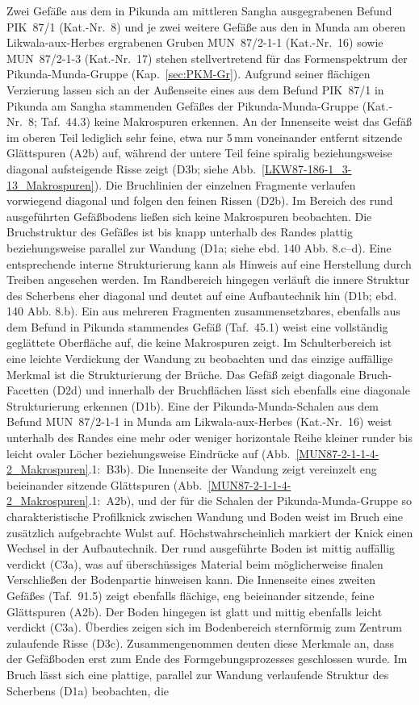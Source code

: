 \begin{multicols}{2}
Zwei Gefäße aus dem in Pikunda am mittleren \mbox{Sangha} ausgegrabenen Befund PIK~87/1 (Kat.-Nr.~8) und je zwei weitere Gefäße aus den in Munda am oberen \mbox{Likwala}-\mbox{aux}-\mbox{Herbes} ergrabenen Gruben MUN~87/2-1-1 (Kat.-Nr.~16) sowie MUN~87/2-1-3 (Kat.-Nr.~17) stehen stellvertretend für das Formenspektrum der Pikunda-Munda-Gruppe (Kap.~\ref{sec:PKM-Gr}). Aufgrund seiner flächigen Verzierung lassen sich an der Außenseite eines aus dem Befund PIK~87/1 in Pikunda am \mbox{Sangha} stammenden Gefäßes der Pikunda-Munda-Gruppe (Kat.-Nr.~8; Taf.~44.3) keine Makrospuren erkennen. An der Innenseite weist das Gefäß im oberen Teil lediglich sehr feine, etwa nur 5\,mm voneinander entfernt sitzende Glättspuren (A2b) auf, während der untere Teil feine spiralig beziehungsweise diagonal aufsteigende Risse zeigt (D3b; siehe Abb.~\ref{LKW87-186-1_3-13_Makrospuren}). Die Bruchlinien der einzelnen Fragmente verlaufen vorwiegend diagonal und folgen den feinen Rissen (D2b). Im Bereich des rund ausgeführten Gefäßbodens ließen sich keine Makrospuren beobachten. Die Bruchstruktur des Gefäßes ist bis knapp unterhalb des Randes plattig beziehungsweise parallel zur Wandung (D1a; siehe ebd. 140 Abb. 8.c--d). Eine entsprechende interne Strukturierung kann als Hinweis auf eine Herstellung durch Treiben angesehen werden. Im Randbereich hingegen verläuft die innere Struktur des Scherbens eher diagonal und deutet auf eine Aufbautechnik hin (D1b; ebd. 140 Abb. 8.b). Ein aus mehreren Fragmenten zusammensetzbares, ebenfalls aus dem Befund in Pikunda stammendes Gefäß (Taf.~45.1) weist eine vollständig geglättete Oberfläche auf, die keine Makrospuren zeigt. Im Schulterbereich ist eine leichte Verdickung der Wandung zu beobachten und das einzige auffällige Merkmal ist die Strukturierung der Brüche. Das Gefäß zeigt diagonale Bruch-Facetten (D2d) und innerhalb der Bruchflächen lässt sich ebenfalls eine diagonale Strukturierung erkennen (D1b). Eine der Pikunda-Munda-Schalen aus dem Befund MUN~87/2-1-1 in Munda am \mbox{Likwala}-\mbox{aux}-\mbox{Herbes} (Kat.-Nr.~16) weist unterhalb des Randes eine mehr oder weniger horizontale Reihe kleiner runder bis leicht ovaler Löcher beziehungsweise Eindrücke auf (Abb.~\ref{MUN87-2-1-1-4-2_Makrospuren}.1:~B3b). Die Innenseite der Wandung zeigt vereinzelt eng beieinander sitzende Glättspuren (Abb.~\ref{MUN87-2-1-1-4-2_Makrospuren}.1:~A2b), und der für die Schalen der Pikunda-Munda-Gruppe so charakteristische Profilknick zwischen Wandung und Boden weist im Bruch eine zusätzlich aufgebrachte Wulst auf. Höchstwahrscheinlich markiert der Knick einen Wechsel in der Aufbautechnik. Der rund ausgeführte Boden ist mittig auffällig verdickt (C3a), was auf überschüssiges Material beim möglicherweise finalen Verschließen der Bodenpartie hinweisen kann. Die Innenseite eines zweiten Gefäßes (Taf.~91.5) zeigt ebenfalls flächige, eng beieinander sitzende, feine Glättspuren (A2b). Der Boden hingegen ist glatt und mittig ebenfalls leicht verdickt (C3a). Überdies zeigen sich im Bodenbereich sternförmig zum Zentrum zulaufende Risse (D3c). Zusammengenommen deuten diese Merkmale an, dass der Gefäßboden erst zum Ende des Formgebungsprozesses geschlossen wurde. Im Bruch lässt sich eine plattige, parallel zur Wandung verlaufende Struktur des Scherbens (D1a) beobachten, die 
\end{multicols}
